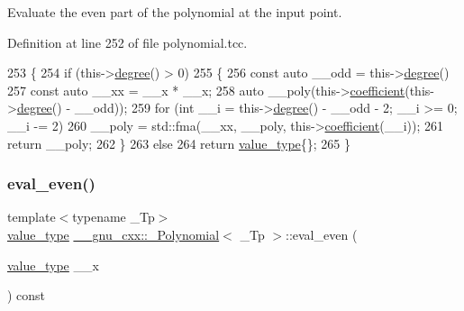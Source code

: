 Evaluate the even part of the polynomial at the input point. 

Definition at line 252 of file polynomial.\+tcc.


\begin{DoxyCode}
253     \{
254       \textcolor{keywordflow}{if} (this->\hyperlink{class____gnu__cxx_1_1__Polynomial_a07d9933aeeb9afbd823218ed921336cb}{degree}() > 0)
255         \{
256           \textcolor{keyword}{const} \textcolor{keyword}{auto} \_\_odd = this->\hyperlink{class____gnu__cxx_1_1__Polynomial_a07d9933aeeb9afbd823218ed921336cb}{degree}() %
257           \textcolor{keyword}{const} \textcolor{keyword}{auto} \_\_xx = \_\_x * \_\_x;
258           \textcolor{keyword}{auto} \_\_poly(this->\hyperlink{class____gnu__cxx_1_1__Polynomial_a7cee31b3acbe8c024af6d696bc610f49}{coefficient}(this->\hyperlink{class____gnu__cxx_1_1__Polynomial_a07d9933aeeb9afbd823218ed921336cb}{degree}() - \_\_odd));
259           \textcolor{keywordflow}{for} (\textcolor{keywordtype}{int} \_\_i = this->\hyperlink{class____gnu__cxx_1_1__Polynomial_a07d9933aeeb9afbd823218ed921336cb}{degree}() - \_\_odd - 2; \_\_i >= 0; \_\_i -= 2)
260             \_\_poly = std::fma(\_\_xx, \_\_poly, this->\hyperlink{class____gnu__cxx_1_1__Polynomial_a7cee31b3acbe8c024af6d696bc610f49}{coefficient}(\_\_i));
261           \textcolor{keywordflow}{return} \_\_poly;
262         \}
263       \textcolor{keywordflow}{else}
264         \textcolor{keywordflow}{return} \hyperlink{class____gnu__cxx_1_1__Polynomial_a725563351f50e76084a7a016c06f8a53}{value\_type}\{\};
265     \}
\end{DoxyCode}
\mbox{\label{class____gnu__cxx_1_1__Polynomial_ac70ecc3968e15077ef2d68390d150f5a}} 
\subsubsection{\texorpdfstring{eval\+\_\+even()}{eval\_even()}\hspace{0.1cm}{\footnotesize\ttfamily [2/3]}}
{\footnotesize\ttfamily template$<$typename \+\_\+\+Tp$>$ \\
\hyperlink{class____gnu__cxx_1_1__Polynomial_a725563351f50e76084a7a016c06f8a53}{value\+\_\+type} \hyperlink{class____gnu__cxx_1_1__Polynomial}{\+\_\+\+\_\+gnu\+\_\+cxx\+::\+\_\+\+Polynomial}$<$ \+\_\+\+Tp $>$\+::eval\+\_\+even (\begin{DoxyParamCaption}\item[{\hyperlink{class____gnu__cxx_1_1__Polynomial_a725563351f50e76084a7a016c06f8a53}{value\+\_\+type}}]{\+\_\+\+\_\+x }\end{DoxyParamCaption}) const}

